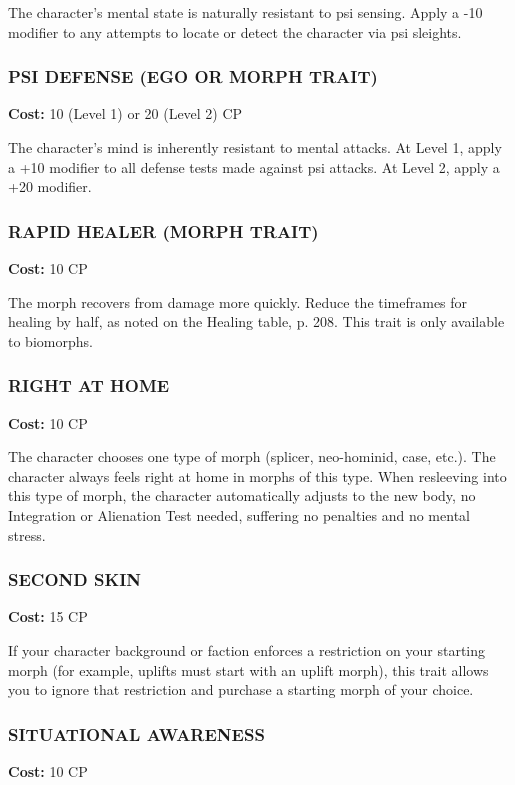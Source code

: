 The character’s mental state is naturally resistant to psi sensing. Apply a -10
modifier to any attempts to locate or detect the character via psi sleights.

\subsubsection{PSI DEFENSE (EGO OR MORPH TRAIT)}
\textbf{Cost:} 10 (Level 1) or 20 (Level 2) CP

The character’s mind is inherently resistant to mental attacks. At Level 1,
apply a +10 modifier to all defense tests made against psi attacks. At Level 2,
apply a +20 modifier.

\subsubsection{RAPID HEALER (MORPH TRAIT)}
\textbf{Cost:} 10 CP

The morph recovers from damage more quickly.  Reduce the timeframes for healing
by half, as noted on the Healing table, p. 208. This trait is only available
to biomorphs.

\subsubsection{RIGHT AT HOME}
\textbf{Cost:} 10 CP

The character chooses one type of morph (splicer, neo-hominid, case, etc.). The
character always feels right at home in morphs of this type. When resleeving
into this type of morph, the character automatically adjusts to the new body,
no Integration or Alienation Test needed, suffering no penalties and no mental
stress.

\subsubsection{SECOND SKIN}
\textbf{Cost:} 15 CP

If your character background or faction enforces a restriction on your starting
morph (for example, uplifts must start with an uplift morph), this trait
allows you to ignore that restriction and purchase a starting morph of your
choice.

\subsubsection{SITUATIONAL AWARENESS}
\textbf{Cost:} 10 CP

